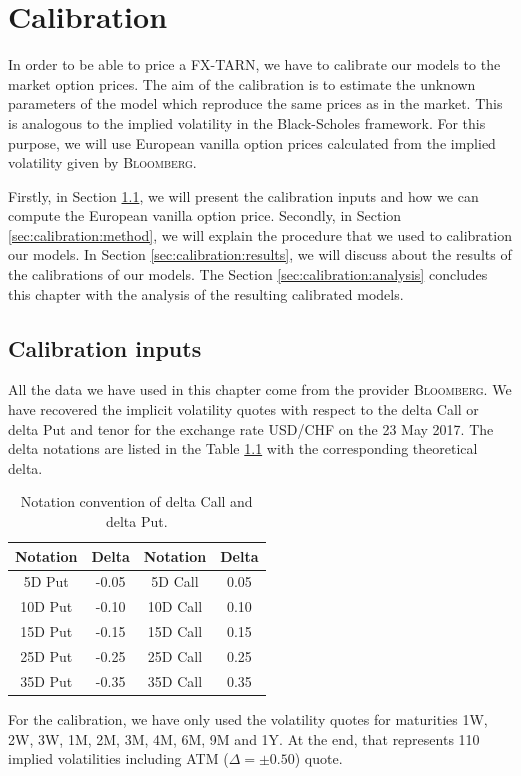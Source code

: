 \chapter{Calibration}
\label{sec:calibration}


In order to be able to price a FX-TARN, we have to calibrate our models to the market option prices. The aim of the calibration is to estimate the unknown parameters of the model which reproduce the same prices as in the market. This is analogous to the implied volatility in the Black-Scholes framework. For this purpose, we will use European vanilla option prices calculated from the implied volatility given by \textsc{Bloomberg}.

Firstly, in Section \ref{sec:calibration:inputs}, we will present the calibration inputs and how we can compute the European vanilla option price. Secondly, in Section \ref{sec:calibration:method}, we will explain the procedure that we used to calibration our models. In Section \ref{sec:calibration:results}, we will discuss about the results of the calibrations of our models. The Section \ref{sec:calibration:analysis} concludes this chapter with the analysis of the resulting calibrated models.

\section{Calibration inputs}
\label{sec:calibration:inputs}
All the data we have used in this chapter come from the provider \textsc{Bloomberg}. We have recovered the implicit volatility quotes with respect to the delta Call or delta Put and tenor for the exchange rate USD/CHF on the 23 May 2017. The delta notations are listed in the Table \ref{tab:delta} with the corresponding theoretical delta. 

\begin{table}[!ht]
\centering
  \begin{tabular}{c|c||c|c}
   \toprule
   Notation & Delta & Notation & Delta\\
   \toprule
   5D Put & -0.05  & 5D Call  & 0.05\\ 
   10D Put & -0.10 & 10D Call & 0.10\\
   15D Put & -0.15 & 15D Call & 0.15\\
   25D Put & -0.25 & 25D Call & 0.25\\
   35D Put & -0.35 & 35D Call & 0.35\\
   \bottomrule
  \end{tabular}
  \vspace{5pt}
  \caption{\label{tab:delta} Notation convention of delta Call and delta Put.}
\end{table}
For the calibration, we have only used the volatility quotes for maturities 1W, 2W, 3W, 1M, 2M, 3M, 4M, 6M, 9M and 1Y. At the end, that represents 110 implied volatilities including ATM ($\Delta = \pm 0.50$) quote.

